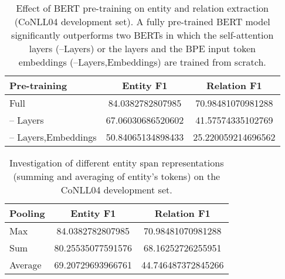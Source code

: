 \documentclass{ecai}
\begin{document}
\begin{table}
\centering
\begin{tabular}{l S S}
\toprule
    \textbf{Pre-training} & \textbf{Entity F1} & \textbf{Relation F1} \\ \midrule
    Full & 84.0382782807985 & 70.98481070981288 \\
    -- Layers & 67.06030686520602 & 41.57574335102769 \\
    -- Layers,Embeddings & 50.84065134898433 & 25.220059214696562 \\
\bottomrule
\end{tabular}
\caption{Effect of BERT pre-training on entity and relation extraction (CoNLL04 development set). A fully pre-trained BERT model significantly outperforms two BERTs in which the self-attention layers (--Layers) or the layers and the BPE input token embeddings (--Layers,Embeddings) are trained from scratch.}
\label{table:pretraining} 
\end{table}
\begin{table}
\centering
\begin{tabular}{l S S}
\toprule
    \textbf{Pooling} & \textbf{Entity F1} & \textbf{Relation F1} \\ \midrule
    
    Max & 84.0382782807985 & 70.98481070981288 \\
    Sum & 80.25535077591576 & 68.16252726255951 \\
    Average & 69.20729693966761 & 44.746487372845266 \\
\bottomrule
\end{tabular}
\caption{Investigation of different entity span representations  (summing and averaging of entity's tokens) on the CoNLL04 development set.}
\label{table:architecture} 
\end{table}
\end{document}
